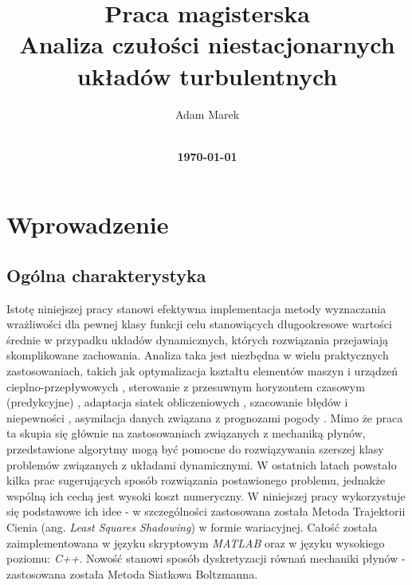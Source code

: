 \documentclass[12pt]{article}
\title{
    \vspace*{-3cm}
    \vspace*{5cm}
    {Praca magisterska\bf} \\
    \vspace*{1cm}
    {\bf Analiza czułości niestacjonarnych układów turbulentnych} \\
    \vspace*{2cm}
}
\author{
    \sffamily Adam Marek\\
    \\[6cm]
}
\date{ {\small \bf \today} }
\begin{document}
\maketitle
\newpage
\tableofcontents
\newpage

%
\cleardoublepage


%


%


\section{Wprowadzenie}
\subsection{Ogólna charakterystyka}
Istotę niniejszej pracy stanowi efektywna implementacja metody wyznaczania wrażliwości dla pewnej klasy funkcji celu stanowiących długookresowe wartości średnie w przypadku układów dynamicznych, których rozwiązania przejawiają skomplikowane zachowania. Analiza taka jest niezbędna w wielu praktycznych zastosowaniach, takich jak optymalizacja kształtu elementów maszyn i urządzeń cieplno-przepływowych \cite{Jameson}, sterowanie z przesuwnym horyzontem czasowym (predykcyjne) \cite{Bewley1}\cite{Bewley2}, adaptacja siatek obliczeniowych \cite{Venditti}, szacowanie błędów i niepewności \cite{Cavaglieri}, asymilacja danych związana z prognozami pogody \cite{Thepaut}. Mimo że praca ta skupia się głównie na zastosowaniach związanych z mechaniką płynów, przedstawione algorytmy mogą być pomocne do rozwiązywania szerszej klasy problemów związanych z układami dynamicznymi.\newline 
W ostatnich latach powstało kilka prac sugerujących sposób rozwiązania postawionego problemu, jednakże wspólną ich cechą jest wysoki koszt numeryczny. W niniejszej pracy wykorzystuje się podstawowe ich idee - w szczególności zastosowana została Metoda Trajektorii Cienia (ang. \textit{Least Squares Shadowing}) w formie wariacyjnej. Całość została zaimplementowana w języku skryptowym \textit{MATLAB} oraz w języku wysokiego poziomu: \textit{C++}. Nowość stanowi sposób dyskretyzacji równań mechaniki płynów - zastosowana została Metoda Siatkowa Boltzmanna.
\end{document}
